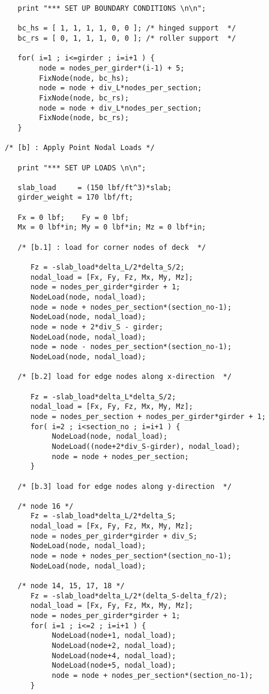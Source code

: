 \begin{footnotesize}
\begin{verbatim}
   print "*** SET UP BOUNDARY CONDITIONS \n\n";

   bc_hs = [ 1, 1, 1, 1, 0, 0 ]; /* hinged support  */
   bc_rs = [ 0, 1, 1, 1, 0, 0 ]; /* roller support  */

   for( i=1 ; i<=girder ; i=i+1 ) {
        node = nodes_per_girder*(i-1) + 5;
        FixNode(node, bc_hs);
        node = node + div_L*nodes_per_section;
        FixNode(node, bc_rs);
        node = node + div_L*nodes_per_section;
        FixNode(node, bc_rs);
   }

/* [b] : Apply Point Nodal Loads */

   print "*** SET UP LOADS \n\n";

   slab_load     = (150 lbf/ft^3)*slab;
   girder_weight = 170 lbf/ft;

   Fx = 0 lbf;    Fy = 0 lbf;
   Mx = 0 lbf*in; My = 0 lbf*in; Mz = 0 lbf*in;

   /* [b.1] : load for corner nodes of deck  */

      Fz = -slab_load*delta_L/2*delta_S/2;
      nodal_load = [Fx, Fy, Fz, Mx, My, Mz];
      node = nodes_per_girder*girder + 1;
      NodeLoad(node, nodal_load);
      node = node + nodes_per_section*(section_no-1);
      NodeLoad(node, nodal_load);
      node = node + 2*div_S - girder;
      NodeLoad(node, nodal_load);
      node = node - nodes_per_section*(section_no-1);
      NodeLoad(node, nodal_load);

   /* [b.2] load for edge nodes along x-direction  */

      Fz = -slab_load*delta_L*delta_S/2;
      nodal_load = [Fx, Fy, Fz, Mx, My, Mz];
      node = nodes_per_section + nodes_per_girder*girder + 1;
      for( i=2 ; i<section_no ; i=i+1 ) {
           NodeLoad(node, nodal_load);
           NodeLoad((node+2*div_S-girder), nodal_load);
           node = node + nodes_per_section;
      }

   /* [b.3] load for edge nodes along y-direction  */

   /* node 16 */
      Fz = -slab_load*delta_L/2*delta_S;
      nodal_load = [Fx, Fy, Fz, Mx, My, Mz];
      node = nodes_per_girder*girder + div_S;
      NodeLoad(node, nodal_load);
      node = node + nodes_per_section*(section_no-1);
      NodeLoad(node, nodal_load);

   /* node 14, 15, 17, 18 */
      Fz = -slab_load*delta_L/2*(delta_S-delta_f/2);
      nodal_load = [Fx, Fy, Fz, Mx, My, Mz];
      node = nodes_per_girder*girder + 1;
      for( i=1 ; i<=2 ; i=i+1 ) {
           NodeLoad(node+1, nodal_load);
           NodeLoad(node+2, nodal_load);
           NodeLoad(node+4, nodal_load);
           NodeLoad(node+5, nodal_load);
           node = node + nodes_per_section*(section_no-1);
      }


\end{verbatim}
\end{footnotesize}
